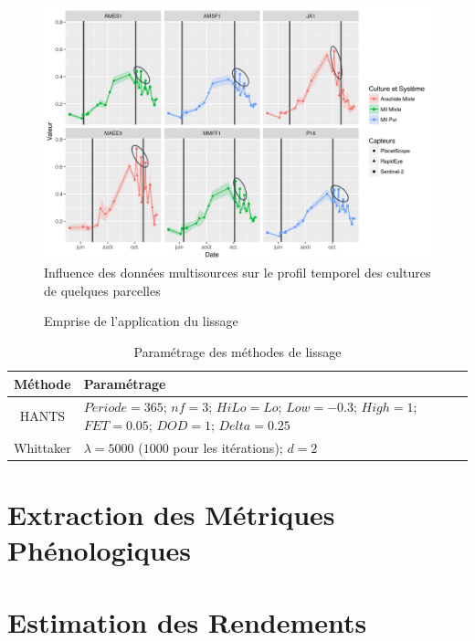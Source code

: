 \begin{figure}[htbp]
 \begin{center}
  \includegraphics[scale=0.6]{materiels_methodes/multisource.png} 
 \end{center}
 \caption{Influence des données multisources sur le profil temporel des cultures de quelques parcelles}
 \label{fig-multisource}
\end{figure}

\begin{figure}[htbp]
 \begin{center}
 \end{center}
 \caption{Emprise de l'application du lissage}
 \label{fig-carte-lissage}
\end{figure}

\begin{table}[htbp]
\begin{center}
\caption{Paramétrage des méthodes de lissage}
\label{tab-param-hants-whit}
 \begin{tabular}{c>{\centering\arraybackslash}p{10cm}}
  \hline
  Méthode & Paramétrage\\
  \hline
  HANTS & $P\acute{e}riode = 365$; $nf = 3$; $HiLo = Lo$; $Low=-0.3$; $High=1$; $FET=0.05$; $DOD=1$; $Delta=0.25$ \\
  Whittaker & $\lambda = 5000$ ($1000$ pour les itérations); $d = 2$ \\
  \hline
 \end{tabular}
\end{center}
\end{table}





\section{Extraction des Métriques Phénologiques}

\section{Estimation des Rendements}
